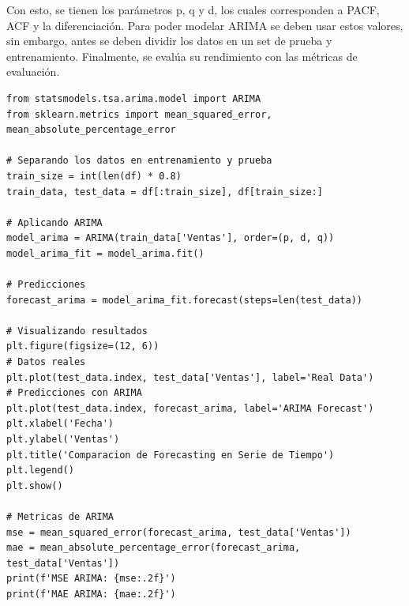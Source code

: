 \documentclass[a4paper, 12pt]{book}
\begin{document}
Con esto, se tienen los parámetros p, q y d, los cuales corresponden a PACF, ACF y la diferenciación. Para poder modelar ARIMA se deben usar estos valores, sin embargo, antes se deben dividir los datos en un set de prueba y entrenamiento. Finalmente, se evalúa su rendimiento con las métricas de evaluación.
\begin{verbatim}
from statsmodels.tsa.arima.model import ARIMA
from sklearn.metrics import mean_squared_error, mean_absolute_percentage_error

# Separando los datos en entrenamiento y prueba
train_size = int(len(df) * 0.8)
train_data, test_data = df[:train_size], df[train_size:]

# Aplicando ARIMA
model_arima = ARIMA(train_data['Ventas'], order=(p, d, q))
model_arima_fit = model_arima.fit()

# Predicciones
forecast_arima = model_arima_fit.forecast(steps=len(test_data))

# Visualizando resultados
plt.figure(figsize=(12, 6))
# Datos reales
plt.plot(test_data.index, test_data['Ventas'], label='Real Data')
# Predicciones con ARIMA
plt.plot(test_data.index, forecast_arima, label='ARIMA Forecast')
plt.xlabel('Fecha')
plt.ylabel('Ventas')
plt.title('Comparacion de Forecasting en Serie de Tiempo')
plt.legend()
plt.show()

# Metricas de ARIMA
mse = mean_squared_error(forecast_arima, test_data['Ventas'])
mae = mean_absolute_percentage_error(forecast_arima, test_data['Ventas'])
print(f'MSE ARIMA: {mse:.2f}')
print(f'MAE ARIMA: {mae:.2f}')
\end{verbatim}
\end{document}
